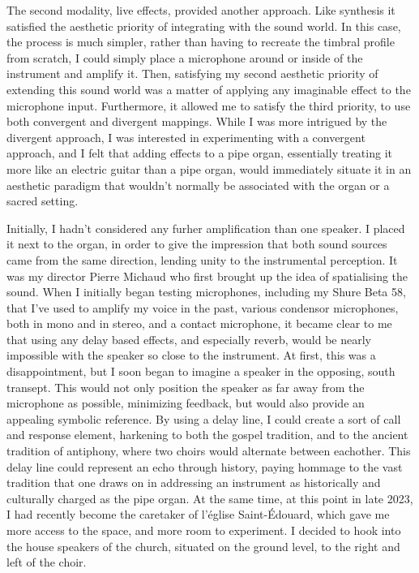 \documentclass[12pt,twoside,maitrise]{dms_ks}
\theoremstyle{definition}
\begin{document}
{The second modality, live effects, provided another approach. 
Like synthesis it satisfied the aesthetic priority of integrating with the sound world. 
In this case, the process is much simpler, rather than having to recreate the timbral profile from scratch, I could simply place a microphone around or inside of the instrument and amplify it. 
Then, satisfying my second aesthetic priority of extending this sound world was a matter of applying any imaginable effect to the microphone input. 
Furthermore, it allowed me to satisfy the third priority, to use both convergent and divergent mappings. 
While I was more intrigued by the divergent approach, I was interested in experimenting with a convergent approach, and I felt that adding effects to a pipe organ, essentially treating it more like an electric guitar than a pipe organ, would immediately situate it in an aesthetic paradigm that wouldn't normally be associated with the organ or a sacred setting. 

Initially, I hadn't considered any furher amplification than one speaker. 
I placed it next to the organ, in order to give the impression that both sound sources came from the same direction, lending unity to the instrumental perception. 
It was my director Pierre Michaud who first brought up the idea of spatialising the sound. 
When I initially began testing microphones, including my Shure Beta 58, that I've used to amplify my voice in the past, various condensor microphones, both in mono and in stereo, and a contact microphone, it became clear to me that using any delay based effects, and especially reverb, would be nearly impossible with the speaker so close to the instrument. 
At first, this was a disappointment, but I soon began to imagine a speaker in the opposing, south transept. 
This would not only position the speaker as far away from the microphone as possible, minimizing feedback, but would also provide an appealing symbolic reference. 
By using a delay line, I could create a sort of call and response element, harkening to both the gospel tradition, and to the ancient tradition of antiphony, where two choirs would alternate between eachother. 
This delay line could represent an echo through history, paying hommage to the vast tradition that one draws on in addressing an instrument as historically and culturally charged as the pipe organ. 
At the same time, at this point in late 2023, I had recently become the caretaker of l'église Saint-Édouard, which gave me more access to the space, and more room to experiment. 
I decided to hook into the house speakers of the church, situated on the ground level, to the right and left of the choir. 

}
\end{document}
